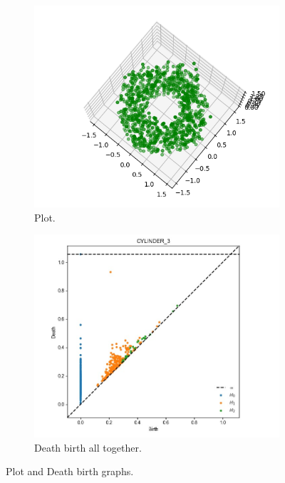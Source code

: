 \documentclass[11pt,a4paper]{report}
\begin{document}
              \begin{figure}[H]
                \centering
                \begin{subfigure}[b]{0.45\linewidth}
                  \includegraphics[width=\linewidth]{./ripser/rand_cyl.PNG}
                  \caption{Plot.}
                \end{subfigure}
                \begin{subfigure}[b]{0.45\linewidth}
                  \includegraphics[width=\linewidth]{./ripser/rand_cyclinder_per_homology.jpg}
                  \caption{Death birth all together.}
                \end{subfigure}
                \caption{Plot and Death birth graphs.}
                \label{fig: plot death}
              \end{figure}
\end{document}
